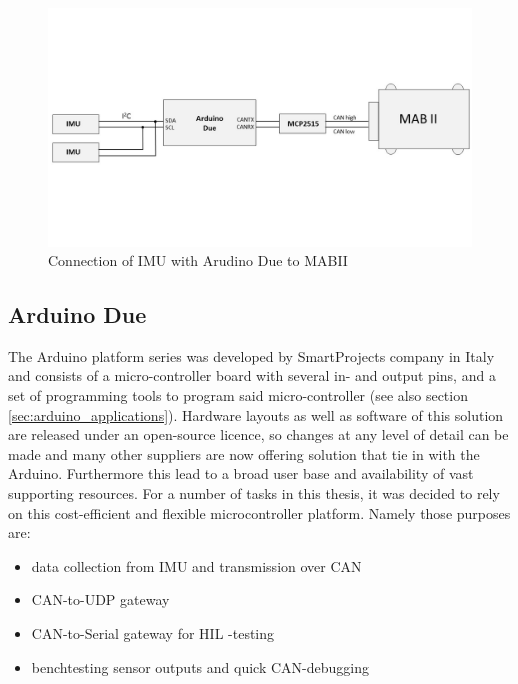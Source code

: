 \documentclass[ExampleMasters.tex]{subfiles}
\begin{document}
\begin{figure}[!htb]
\centering
\includegraphics[width=1\linewidth]{figures/IMU_overview}
\caption{Connection of \gls{IMU} with Arudino Due to \gls{MABII}}
\label{fig:IMU_overview}
\end{figure}



\subsection{Arduino Due}
\label{sec:arduino}

The Arduino platform series was developed by  SmartProjects company in Italy and consists of a micro-controller board with several in- and output pins, and a set of programming tools to program said micro-controller (see also section \ref{sec:arduino_applications}). Hardware layouts as well as software of this solution are released under an open-source licence, so changes at any level of detail can be made and many other suppliers are now offering solution that tie in with the Arduino. Furthermore this lead to a broad user base and availability of vast supporting resources. For a number of tasks in this thesis, it was decided to rely on this cost-efficient and flexible microcontroller platform. Namely those purposes are:

\begin{itemize}	
	\item data collection from \gls{IMU} and transmission over CAN
	\item CAN-to-UDP gateway
	\item CAN-to-Serial gateway for \gls{HIL} -testing
	\item benchtesting sensor outputs and quick CAN-debugging
\end{itemize}
\end{document}
